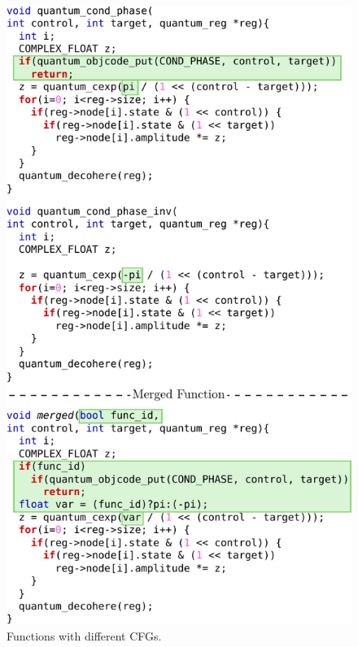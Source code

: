 \begin{figure}[t!]
  \centering
  \includegraphics[width=\linewidth]{figs/libquantum-example.pdf}
  \caption{Functions with different CFGs.}
  \label{fig:libquantum-example}
\end{figure}
